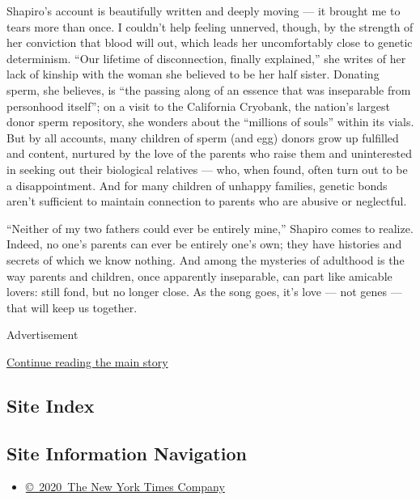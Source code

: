 Shapiro's account is beautifully written and deeply moving --- it
brought me to tears more than once. I couldn't help feeling unnerved,
though, by the strength of her conviction that blood will out, which
leads her uncomfortably close to genetic determinism. ``Our lifetime of
disconnection, finally explained,'' she writes of her lack of kinship
with the woman she believed to be her half sister. Donating sperm, she
believes, is ``the passing along of an essence that was inseparable from
personhood itself''; on a visit to the California Cryobank, the nation's
largest donor sperm repository, she wonders about the ``millions of
souls'' within its vials. But by all accounts, many children of sperm
(and egg) donors grow up fulfilled and content, nurtured by the love of
the parents who raise them and uninterested in seeking out their
biological relatives --- who, when found, often turn out to be a
disappointment. And for many children of unhappy families, genetic bonds
aren't sufficient to maintain connection to parents who are abusive or
neglectful.

``Neither of my two fathers could ever be entirely mine,'' Shapiro comes
to realize. Indeed, no one's parents can ever be entirely one's own;
they have histories and secrets of which we know nothing. And among the
mysteries of adulthood is the way parents and children, once apparently
inseparable, can part like amicable lovers: still fond, but no longer
close. As the song goes, it's love --- not genes --- that will keep us
together.

Advertisement

\protect\hyperlink{after-bottom}{Continue reading the main story}

\hypertarget{site-index}{%
\subsection{Site Index}\label{site-index}}

\hypertarget{site-information-navigation}{%
\subsection{Site Information
Navigation}\label{site-information-navigation}}

\begin{itemize}
\tightlist
\item
  \href{https://help.nytimes3xbfgragh.onion/hc/en-us/articles/115014792127-Copyright-notice}{©~2020~The
  New York Times Company}
\end{itemize}

